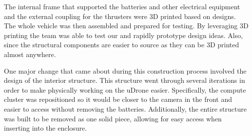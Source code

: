 The internal frame that supported the batteries and other electrical equipment and the external coupling for the thrusters were 3D printed based on designs. The whole vehicle was then assembled and prepared for testing. By leveraging 3D printing the team was able to test our and rapidly prototype design ideas. Also, since the structural components are easier to source as they can be 3D printed almost anywhere. 

One major change that came about during this construction process involved the design of the interior structure. This structure went through several iterations in order to make physically working on the uDrone easier. Specifically, the compute cluster was repositioned so it would be closer to the camera in the front and easier to access without removing the batteries. Additionally, the entire structure was built to be removed as one solid piece, allowing for easy access when inserting into the enclosure. 





